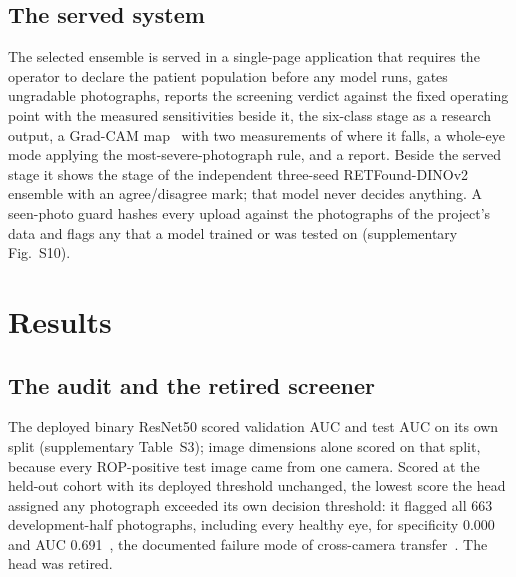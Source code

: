 \documentclass[journal]{IEEEtran}
\begin{document}
\subsection{The served system}
The selected ensemble is served in a single-page application that requires the operator to declare the patient population before any model runs, gates ungradable photographs, reports the screening verdict against the fixed operating point with the measured sensitivities beside it, the six-class stage as a research output, a Grad-CAM map~\cite{selvaraju2017} with two measurements of where it falls, a whole-eye mode applying the most-severe-photograph rule, and a report. Beside the served stage it shows the stage of the independent three-seed RETFound-DINOv2 ensemble with an agree/disagree mark; that model never decides anything. A seen-photo guard hashes every upload against the \stageLabelled{} photographs of the project's data and flags any that a model trained or was tested on (supplementary Fig.~S10).

\section{Results}\label{sec:results}
\subsection{The audit and the retired screener}
The deployed binary ResNet50 scored validation AUC \sweepValAUC{} and test AUC \sweepAUC{} on its own split (supplementary Table~S3); image dimensions alone scored \shortcutAUC{} on that split, because every ROP-positive test image came from one camera. Scored at the held-out cohort with its deployed threshold unchanged, the lowest score the head assigned any photograph exceeded its own decision threshold: it flagged all 663 development-half photographs, including every healthy eye, for specificity 0.000 and AUC 0.691~\cite{nagpure2026}, the documented failure mode of cross-camera transfer~\cite{chen2021}. The head was retired.
\end{document}
